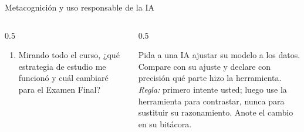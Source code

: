 \documentclass[10pt,aspectratio=169]{beamer}
\begin{document}
\begin{frame}{Metacognición y uso responsable de la IA}
  \small
  \begin{columns}[t]
    \begin{column}{0.5\textwidth}
      \begin{metacog}
        \begin{enumerate}
          \metacomun
          \item Mirando todo el curso, ¿qué estrategia de estudio me funcionó y cuál cambiaré para el Examen Final?
        \end{enumerate}
      \end{metacog}
    \end{column}
    \begin{column}{0.5\textwidth}
      \begin{iabox}
        Pida a una IA ajustar su modelo a los datos. Compare con su ajuste y declare con precisión qué parte hizo la herramienta.\\[2pt]
        \textit{Regla:} primero intente usted; luego use la herramienta para contrastar, nunca para sustituir su razonamiento. Anote el cambio en su bitácora.
      \end{iabox}
    \end{column}
  \end{columns}
\end{frame}
\end{document}
